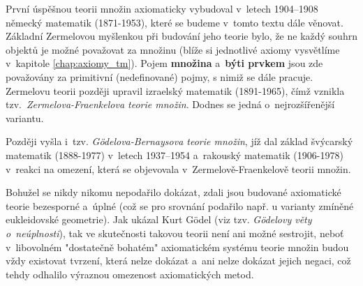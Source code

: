 První úspěšnou teorii množin axiomaticky vybudoval v~letech 1904--1908 německý matematik  \mbox{(1871-1953)}, které se budeme v~tomto textu dále věnovat. Základní Zermelovou myšlenkou při budování jeho teorie bylo, že ne každý souhrn objektů je možné považovat za množinu (blíže si jednotlivé axiomy vysvětlíme v~kapitole \ref{chap:axiomy_tm}). Pojem \textbf{množina} a~\textbf{býti prvkem} jsou zde považovány za primitivní (nedefinované) pojmy, s nimiž se dále pracuje. Zermelovu teorii později upravil izraelský matematik  \mbox{(1891-1965)}, čímž vznikla tzv.~\emph{\mbox{Zermelova-Fraenkelova} teorie množin}. Dodnes se jedná o~nejrozšířenější variantu.\par
Později vyšla i~tzv. \emph{Gödelova-Bernaysova teorie množin}, jíž dal základ švýcarský matematik  \mbox{(1888-1977)} v~letech 1937--1954 a~rakouský matematik  \mbox{(1906-1978)} v~reakci na omezení, která se objevovala v~Zermelově-Fraenkelově teorii množin.

Bohužel se nikdy nikomu nepodařilo dokázat, zdali jsou budované axiomatické teorie bezesporné a~úplné (což se pro srovnání podařilo např. u varianty zmíněné eukleidovské geometrie). Jak ukázal Kurt Gödel (viz tzv. \emph{Gödelovy věty o~neúplnosti}), tak ve skutečnosti takovou teorii není ani možné sestrojit, neboť v~libovolném "dostatečně bohatém" axiomatickém systému teorie množin budou vždy existovat tvrzení, která nelze dokázat a~ani nelze dokázat jejich negaci, což tehdy odhalilo výraznou omezenost axiomatických metod. 